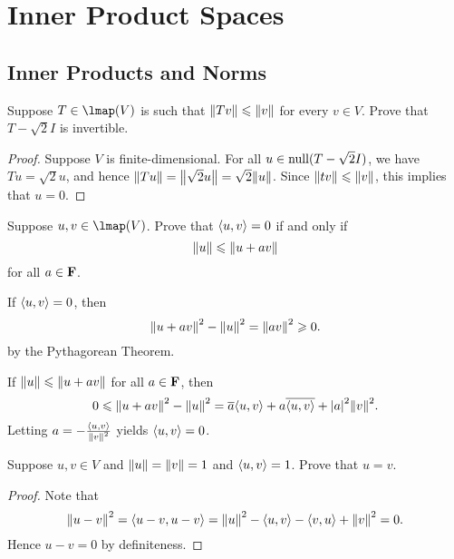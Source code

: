 \chapter{Inner Product Spaces}

\section{Inner Products and Norms}

\begin{exercise}{5}
	Suppose \( T \in \lmap(V) \) is such that \( \norm{Tv} \le \norm{v} \) for every \( v \in V \). Prove that \( T-\sqrt{2}I \) is invertible.
\end{exercise}

\begin{proof}
	Suppose \( V \) is finite-dimensional. For all \( u \in \operatorname{null}(T - \sqrt{2}I) \), we have \( Tu = \sqrt{2}u \), and hence \( \norm{Tu} = \norm{\sqrt{2}u} = \sqrt{2}\norm{u} \). Since \( \norm{tv} \le \norm{v} \), this implies that \( u = 0 \).
\end{proof}

\begin{exercise}{6}
	Suppose \( u, v \in \lmap(V) \). Prove that \( \inp{u}{v} = 0 \) if and only if
	\[
		\norm{u} \le \norm{u + av}
	\]
	for all \( a \in \mathbf{F} \).
\end{exercise}

\begin{solution}
	If \( \inp{u}{v} = 0 \), then
	\[
		\norm{u + av}^{2} - \norm{u}^{2} = \norm{av}^{2} \ge 0.
	\]
	by the Pythagorean Theorem.

	If \( \norm{u} \le \norm{u + av} \) for all \( a \in \mathbf{F} \), then
	\[
		0 \le \norm{u + av}^{2} - \norm{u}^{2} = \conj{a}\inp{u}{v} + a\conj{\inp{u}{v}} + \abs{a}^{2}\norm{v}^{2}.
	\]
	Letting \( a = -\frac{\inp{u}{v}}{\norm{v}^{2}} \) yields \( \inp{u}{v} = 0 \).
\end{solution}

\begin{exercise}{8}
	Suppose \( u, v \in V \) and \( \norm{u} = \norm{v} = 1 \) and \( \inp{u}{v} = 1 \). Prove that \( u = v \).
\end{exercise}

\begin{proof}
	Note that
	\[
		\norm{u - v}^{2} = \inp{u - v}{u - v} = \norm{u}^{2} - \inp{u}{v} - \inp{v}{u} + \norm{v}^{2} = 0.
	\]
	Hence \( u - v = 0 \) by definiteness.
\end{proof}

